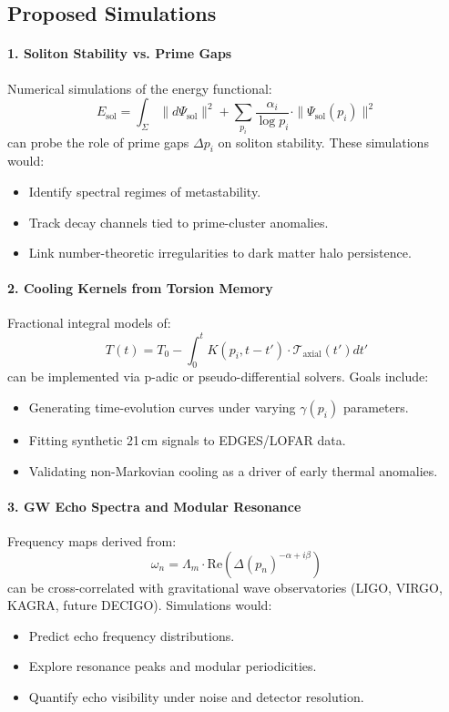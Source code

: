 \documentclass{article}
\theoremstyle{plain}
\begin{document}
\subsection{Proposed Simulations}

\paragraph{1. Soliton Stability vs. Prime Gaps}

Numerical simulations of the energy functional:
\[
E_{\text{sol}} = \int_\Sigma \|d\Psi_{\text{sol}}\|^2 + \sum_{p_i} \frac{\alpha_i}{\log p_i} \cdot \|\Psi_{\text{sol}}(p_i)\|^2
\]
can probe the role of prime gaps $\Delta p_i$ on soliton stability. These simulations would:
\begin{itemize}
    \item Identify spectral regimes of metastability.
    \item Track decay channels tied to prime-cluster anomalies.
    \item Link number-theoretic irregularities to dark matter halo persistence.
\end{itemize}

\paragraph{2. Cooling Kernels from Torsion Memory}

Fractional integral models of:
\[
T(t) = T_0 - \int_0^t K(p_i, t - t') \cdot \mathcal{T}_{\text{axial}}(t') dt'
\]
can be implemented via p-adic or pseudo-differential solvers. Goals include:
\begin{itemize}
    \item Generating time-evolution curves under varying $\gamma(p_i)$ parameters.
    \item Fitting synthetic 21 cm signals to EDGES/LOFAR data.
    \item Validating non-Markovian cooling as a driver of early thermal anomalies.
\end{itemize}

\paragraph{3. GW Echo Spectra and Modular Resonance}

Frequency maps derived from:
\[
\omega_n = \Lambda_m \cdot \text{Re}\left(\Delta(p_n)^{-\alpha + i\beta} \right)
\]
can be cross-correlated with gravitational wave observatories (LIGO, VIRGO, KAGRA, future DECIGO). Simulations would:
\begin{itemize}
    \item Predict echo frequency distributions.
    \item Explore resonance peaks and modular periodicities.
    \item Quantify echo visibility under noise and detector resolution.
\end{itemize}
\end{document}
